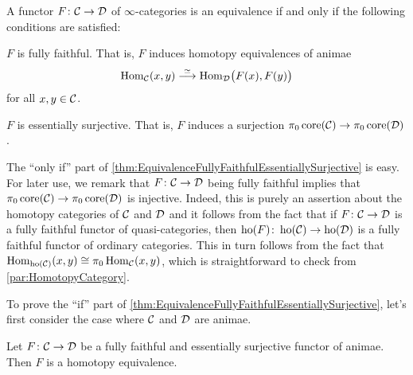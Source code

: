 \begin{thm}\label{thm:EquivalenceFullyFaithfulEssentiallySurjective}
	A functor $F\colon \mathcal{C}\rightarrow \mathcal{D}$ of $\infty$-categories is an equivalence if and only if the following conditions are satisfied:
	\begin{alphanumerate}
		\item $F$ is fully faithful. That is, $F$ induces homotopy equivalences of animae
		\begin{equation*}
			\operatorname{Hom}_{\mathcal{C}}(x,y)\overset{\simeq}{\longrightarrow}\operatorname{Hom}_{\mathcal{D}}\bigl(F(x),F(y)\bigr)
		\end{equation*}
		for all $x,y\in\mathcal{C}$.
		\item $F$ is essentially surjective. That is, $F$ induces a surjection $\pi_0\operatorname{core} (\mathcal{C})\rightarrow\pi_0\operatorname{core}(\mathcal{D})$.
	\end{alphanumerate}
\end{thm}
\begin{rem}\label{rem:FullyFaithfulImpliesInjectiveOnPi0Core}
	The \enquote{only if} part of \cref{thm:EquivalenceFullyFaithfulEssentiallySurjective} is easy. For later use, we remark that $F\colon \mathcal{C}\rightarrow\mathcal{D}$ being fully faithful implies that $\pi_0\operatorname{core}(\mathcal{C})\rightarrow\pi_0\operatorname{core}(\mathcal{D})$ is injective. %
	Indeed, this is purely an assertion about the homotopy categories of $\mathcal{C}$ and $\mathcal{D}$ and it follows from the fact that if $F\colon \mathcal{C}\rightarrow\mathcal{D}$ is a fully faithful functor of quasi-categories, then $\operatorname{ho}(F)\colon \operatorname{ho}(\mathcal{C})\rightarrow \operatorname{ho}(\mathcal{D})$ is a fully faithful functor of ordinary categories. This in turn follows from the fact that $\operatorname{Hom}_{\operatorname{ho}(\mathcal{C})}(x,y)\cong \pi_0\operatorname{Hom}_{\mathcal{C}}(x,y)$, which is straightforward to check from \cref{par:HomotopyCategory}.
\end{rem}
To prove the \enquote{if} part of \cref{thm:EquivalenceFullyFaithfulEssentiallySurjective}, let's first consider the case where $\mathcal{C}$ and $\mathcal{D}$ are animae.
\begin{lem}\label{lem:FullyFaithfulAnimae}
	Let $F\colon \mathcal{C}\rightarrow\mathcal{D}$ be a fully faithful and essentially surjective functor of animae. Then $F$ is a homotopy equivalence.
\end{lem}
